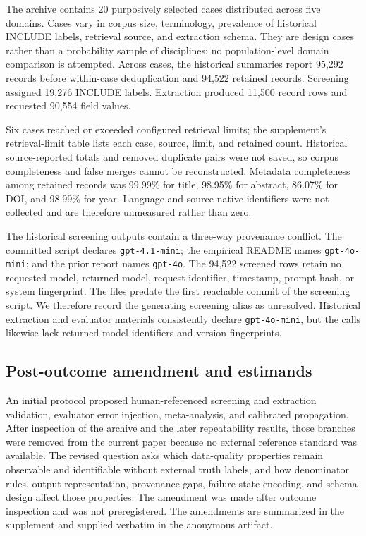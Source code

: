 \documentclass[acmsmall,anonymous,review]{acmart}
\begin{document}
The archive contains 20 purposively selected cases distributed across five domains. Cases vary in corpus size, terminology, prevalence of historical INCLUDE labels, retrieval source, and extraction schema. They are design cases rather than a probability sample of disciplines; no population-level domain comparison is attempted. Across cases, the historical summaries report 95,292 records before within-case deduplication and 94,522 retained records. Screening assigned 19,276 INCLUDE labels. Extraction produced 11,500 record rows and requested 90,554 field values.

Six cases reached or exceeded configured retrieval limits; the supplement's retrieval-limit table lists each case, source, limit, and retained count. Historical source-reported totals and removed duplicate pairs were not saved, so corpus completeness and false merges cannot be reconstructed. Metadata completeness among retained records was 99.99\% for title, 98.95\% for abstract, 86.07\% for DOI, and 98.99\% for year. Language and source-native identifiers were not collected and are therefore unmeasured rather than zero.

The historical screening outputs contain a three-way provenance conflict. The committed script declares \texttt{gpt-4.1-mini}; the empirical README names \texttt{gpt-4o-mini}; and the prior report names \texttt{gpt-4o}. The 94,522 screened rows retain no requested model, returned model, request identifier, timestamp, prompt hash, or system fingerprint. The files predate the first reachable commit of the screening script. We therefore record the generating screening alias as unresolved. Historical extraction and evaluator materials consistently declare \texttt{gpt-4o-mini}, but the calls likewise lack returned model identifiers and version fingerprints.

\subsection{Post-outcome amendment and estimands}

An initial protocol proposed human-referenced screening and extraction validation, evaluator error injection, meta-analysis, and calibrated propagation. After inspection of the archive and the later repeatability results, those branches were removed from the current paper because no external reference standard was available. The revised question asks which data-quality properties remain observable and identifiable without external truth labels, and how denominator rules, output representation, provenance gaps, failure-state encoding, and schema design affect those properties. The amendment was made after outcome inspection and was not preregistered. The amendments are summarized in the supplement and supplied verbatim in the anonymous artifact.
\end{document}
